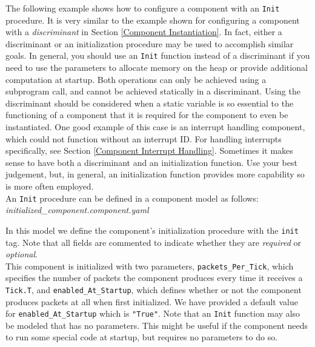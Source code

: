 The following example shows how to configure a component with an \texttt{Init} procedure. It is very similar to the example shown for configuring a component with a \textit{discriminant} in Section \ref{Component Instantiation}. In fact, either a discriminant or an initialization procedure may be used to accomplish similar goals. In general, you should use an \texttt{Init} function instead of a discriminant if you need to use the parameters to allocate memory on the heap or provide additional computation at startup. Both operations can only be achieved using a subprogram call, and cannot be achieved statically in a discriminant. Using the discriminant should be considered when a static variable is so essential to the functioning of a component that it is required for the component to even be instantiated. One good example of this case is an interrupt handling component, which could not function without an interrupt ID. For handling interrupts specifically, see Section \ref{Component Interrupt Handling}. Sometimes it makes sense to have both a discriminant and an initialization function. Use your best judgement, but, in general, an initialization function provides more capability so is more often employed. \\

An \texttt{Init} procedure can be defined in a component model as follows: \\

\textit{initialized\_component.component.yaml}

In this model we define the component's initialization procedure with the \texttt{init} tag. Note that all fields are commented to indicate whether they are \textit{required} or \textit{optional}. \\

This component is initialized with two parameters, \texttt{packets\_Per\_Tick}, which specifies the number of packets the component produces every time it receives a \texttt{Tick.T}, and \texttt{enabled\_At\_Startup}, which defines whether or not the component produces packets at all when first initialized. We have provided a default value for \texttt{enabled\_At\_Startup} which is \texttt{"True"}. Note that an \texttt{Init} function may also be modeled that has no parameters. This might be useful if the component needs to run some special code at startup, but requires no parameters to do so. \\

